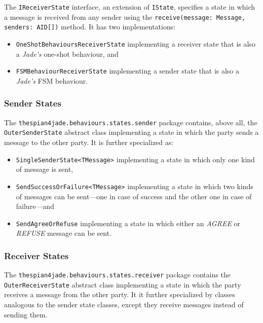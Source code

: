 The \texttt{IReceiverState} interface, an extension of \texttt{IState}, specifies a state in which a message is received from any sender using the \texttt{receive(message: Message, senders: AID[])} method.
It has two implementations:
\begin{itemize}
	\item \texttt{OneShotBehavioursReceiverState} implementing a receiver state that is also a \textit{Jade's} one-shot behaviour, and
	\item \texttt{FSMBehaviourReceiverState} implementing a sender state that is also a \textit{Jade's} FSM behaviour.
\end{itemize}

\subsubsection*{Sender States}

The \texttt{thespian4jade.behaviours.states.sender} package contains, above all, the \texttt{OuterSenderState} abstract class implementing a state in which the party sends a message to the other party.
It is further specialized as:
\begin{itemize}
	\item \texttt{SingleSenderState<TMessage>} implementing a state in which only one kind of message is sent,
	\item \texttt{SendSuccessOrFailure<TMessage>} implementing a state in which two kinds of messages can be sent---one in case of success and the other one in case of failure---and 
	\item \texttt{SendAgreeOrRefuse} implementing a state in which either an \textit{AGREE} or \textit{REFUSE} message can be sent.
\end{itemize}

\subsubsection*{Receiver States}

The \texttt{thespian4jade.behaviours.states.receiver} package contains the \texttt{OuterReceiverState} abstract class implementing a state in which the party receives a message from the other party.
It it further specialized by classes analogous to the sender state classes, except they receive messages instead of sending them.


